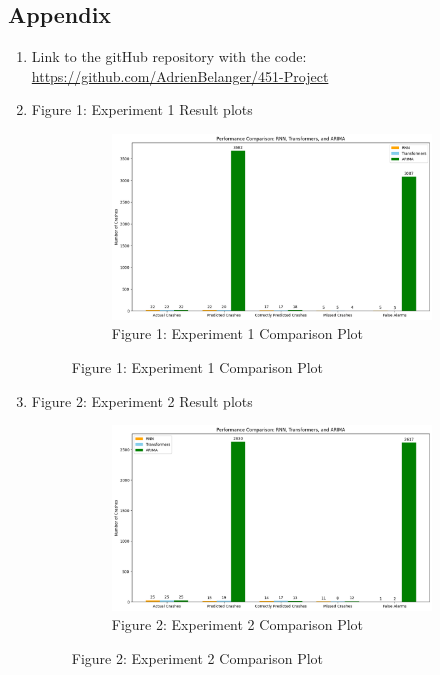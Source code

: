 \documentclass[12pt, letterpaper]{article}
\begin{document}
\subsection*{Appendix}
\begin{enumerate}
    \item Link to the gitHub repository with the code: \url{https://github.com/AdrienBelanger/451-Project}
    \item Figure 1: Experiment 1 Result plots 
    \begin{figure}[H]
        \centering
        \begin{subfigure}[b]{0.9\textwidth}
            \centering
            \includegraphics[width=\textwidth]{exp1_figure.png}
            \caption{Figure 1: Experiment 1 Comparison Plot}
        \end{subfigure}
        \hfill
    \end{figure}

    \item Figure 2: Experiment 2 Result plots 
    \begin{figure}[H]
        \centering
        \begin{subfigure}[b]{0.9\textwidth}
            \centering
            \includegraphics[width=\textwidth]{exp2_figure.png}
            \caption{Figure 2: Experiment 2 Comparison Plot}
        \end{subfigure}
        \hfill
    \end{figure}


\end{enumerate}
\end{document}
